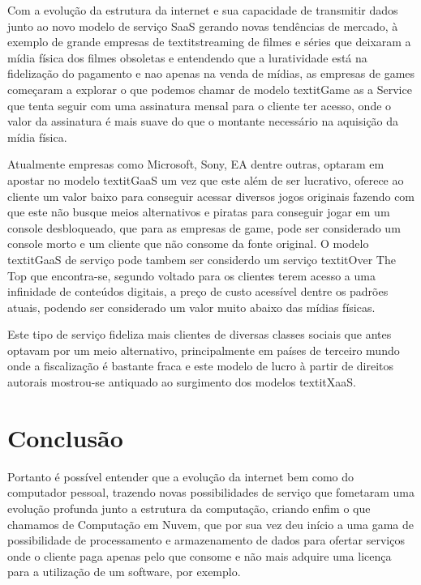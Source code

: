 \begin{justify}
    Com a evolução da estrutura da internet e sua capacidade de transmitir dados junto ao novo
    modelo de serviço SaaS gerando novas tendências de mercado, à exemplo de grande empresas de
    textit{streaming} de filmes e séries que deixaram a mídia física dos filmes obsoletas e
    entendendo que a luratividade está na fidelização do pagamento e nao apenas na venda de mídias,
    as empresas de games começaram a explorar o que podemos chamar de modelo textit{Game as a
    Service} que tenta seguir com uma assinatura mensal para o cliente ter acesso, onde o valor da
    assinatura é mais suave do que o montante necessário na aquisição da mídia física.

    Atualmente empresas como Microsoft, Sony, EA dentre outras, optaram em apostar no modelo
    textit{GaaS} um vez que este além de ser lucrativo, oferece ao cliente um valor baixo para
    conseguir acessar diversos jogos originais fazendo com que este não busque meios alternativos e
    piratas para conseguir jogar em um console desbloqueado, que para as empresas de game, pode ser
    considerado um console morto e um cliente que não consome da fonte original.
    O modelo textit{GaaS} de serviço pode tambem ser considerdo um serviço textit{Over The Top} que
    encontra-se, segundo \cite{tristao2020pirataria} voltado para os clientes terem acesso a uma
    infinidade de conteúdos digitais, a preço de custo acessível dentre os padrões atuais, podendo
    ser considerado um valor muito abaixo das mídias físicas.

    Este tipo de serviço fideliza mais clientes de diversas classes sociais que antes optavam por um
    meio alternativo, principalmente em países de terceiro mundo onde a fiscalização é bastante
    fraca e este modelo de lucro à partir de direitos autorais mostrou-se antiquado ao surgimento
    dos modelos textit{XaaS}.

    \section{Conclusão}
    Portanto é possível entender que a evolução da internet bem como do computador pessoal, trazendo
    novas possibilidades de serviço que fometaram uma evolução profunda junto a estrutura
    da computação, criando enfim o que chamamos de Computação em Nuvem, que por sua vez deu início a
    uma gama de possibilidade de processamento e armazenamento de dados para ofertar serviços onde o
    cliente paga apenas pelo que consome e não mais adquire uma licença para a utilização de um
    software, por exemplo.


\end{justify}
